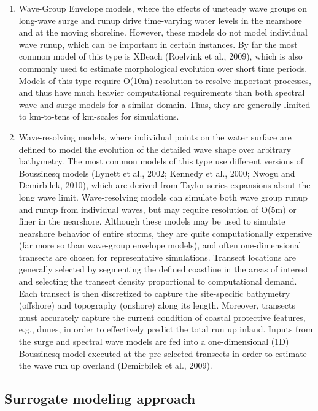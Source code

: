 \begin{enumerate}
    \item Wave-Group Envelope models, where the effects of unsteady wave groups on long-wave surge and runup drive time-varying water levels in the nearshore and at the moving shoreline. However, these models do not model individual wave runup, which can be important in certain instances. By far the most common model of this type is XBeach (Roelvink et al., 2009), which is also commonly used to estimate morphological evolution over short time periods. Models of this type require O(10m) resolution to resolve important processes, and thus have much heavier computational requirements than both spectral wave and surge models for a similar domain. Thus, they are generally limited to km-to-tens of km-scales for simulations. 
    \item Wave-resolving models, where individual points on the water surface are defined to model the evolution of the detailed wave shape over arbitrary bathymetry. The most common models of this type use different versions of Boussinesq models (Lynett et al., 2002; Kennedy et al., 2000; Nwogu and Demirbilek, 2010), which are derived from Taylor series expansions about the long wave limit. Wave-resolving models can simulate both wave group runup and runup from individual waves, but may require resolution of O(5m) or finer in the nearshore. Although these models may be used to simulate nearshore behavior of entire storms, they are quite computationally expensive (far more so than wave-group envelope models), and often one-dimensional transects are chosen for representative simulations. Transect locations are generally selected by segmenting the defined coastline in the areas of interest and selecting the transect density proportional to computational demand. Each transect is then discretized to capture the site-specific bathymetry (offshore) and topography (onshore) along its length. Moreover, transects must accurately capture the current condition of coastal protective features, e.g., dunes, in order to effectively predict the total run up inland. Inputs from the surge and spectral wave models are fed into a one-dimensional (1D) Boussinesq model executed at the pre-selected transects in order to estimate the wave run up overland (Demirbilek et al., 2009). 
\end{enumerate}

\subsection{Surrogate modeling approach}

